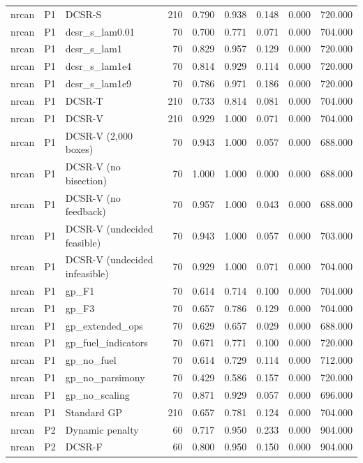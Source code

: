 \begin{tabular}{lllrrrrrr}
nrcan & P1 & DCSR-S & 210 & 0.790 & 0.938 & 0.148 & 0.000 & 720.000 \\
nrcan & P1 & dcsr\_s\_lam0.01 & 70 & 0.700 & 0.771 & 0.071 & 0.000 & 704.000 \\
nrcan & P1 & dcsr\_s\_lam1 & 70 & 0.829 & 0.957 & 0.129 & 0.000 & 720.000 \\
nrcan & P1 & dcsr\_s\_lam1e4 & 70 & 0.814 & 0.929 & 0.114 & 0.000 & 720.000 \\
nrcan & P1 & dcsr\_s\_lam1e9 & 70 & 0.786 & 0.971 & 0.186 & 0.000 & 720.000 \\
nrcan & P1 & DCSR-T & 210 & 0.733 & 0.814 & 0.081 & 0.000 & 704.000 \\
nrcan & P1 & DCSR-V & 210 & 0.929 & 1.000 & 0.071 & 0.000 & 704.000 \\
nrcan & P1 & DCSR-V (2,000 boxes) & 70 & 0.943 & 1.000 & 0.057 & 0.000 & 688.000 \\
nrcan & P1 & DCSR-V (no bisection) & 70 & 1.000 & 1.000 & 0.000 & 0.000 & 688.000 \\
nrcan & P1 & DCSR-V (no feedback) & 70 & 0.957 & 1.000 & 0.043 & 0.000 & 688.000 \\
nrcan & P1 & DCSR-V (undecided feasible) & 70 & 0.943 & 1.000 & 0.057 & 0.000 & 703.000 \\
nrcan & P1 & DCSR-V (undecided infeasible) & 70 & 0.929 & 1.000 & 0.071 & 0.000 & 704.000 \\
nrcan & P1 & gp\_F1 & 70 & 0.614 & 0.714 & 0.100 & 0.000 & 704.000 \\
nrcan & P1 & gp\_F3 & 70 & 0.657 & 0.786 & 0.129 & 0.000 & 704.000 \\
nrcan & P1 & gp\_extended\_ops & 70 & 0.629 & 0.657 & 0.029 & 0.000 & 688.000 \\
nrcan & P1 & gp\_fuel\_indicators & 70 & 0.671 & 0.771 & 0.100 & 0.000 & 720.000 \\
nrcan & P1 & gp\_no\_fuel & 70 & 0.614 & 0.729 & 0.114 & 0.000 & 712.000 \\
nrcan & P1 & gp\_no\_parsimony & 70 & 0.429 & 0.586 & 0.157 & 0.000 & 720.000 \\
nrcan & P1 & gp\_no\_scaling & 70 & 0.871 & 0.929 & 0.057 & 0.000 & 696.000 \\
nrcan & P1 & Standard GP & 210 & 0.657 & 0.781 & 0.124 & 0.000 & 704.000 \\
nrcan & P2 & Dynamic penalty & 60 & 0.717 & 0.950 & 0.233 & 0.000 & 904.000 \\
nrcan & P2 & DCSR-F & 60 & 0.800 & 0.950 & 0.150 & 0.000 & 904.000 \\

\end{tabular}
